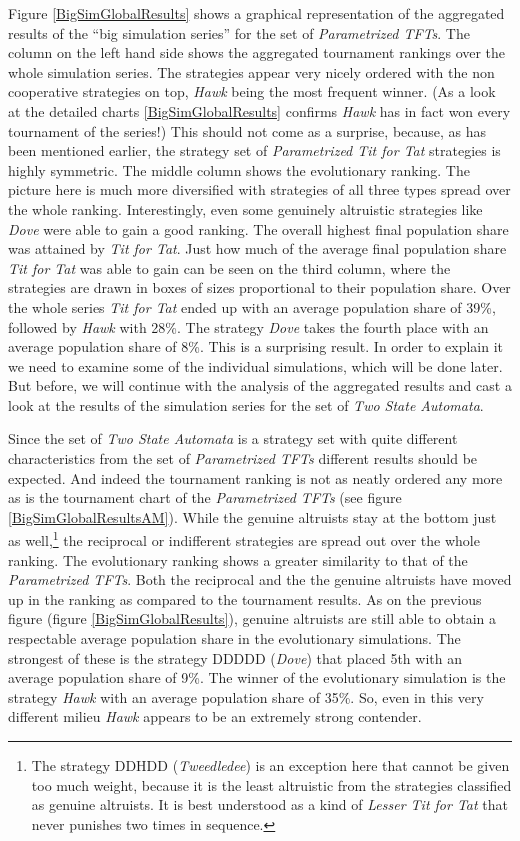 Figure \ref{BigSimGlobalResults} shows a graphical representation of the
aggregated results of the ``big simulation series'' for the set of {\em
  Parametrized TFTs}. The column on the left hand side shows the aggregated
tournament rankings over the whole simulation series. The strategies appear
very nicely ordered with the non cooperative strategies on top, {\em Hawk}
being the most frequent winner. (As a look at the detailed charts
\ref{BigSimGlobalResults} confirms {\em Hawk} has in fact won every tournament
of the series!) This should not come as a surprise, because, as has been
mentioned earlier, the strategy set of {\em Parametrized Tit for Tat}
strategies is highly symmetric. The middle column shows the evolutionary
ranking. The picture here is much more diversified with strategies of all
three types spread over the whole ranking. Interestingly, even some genuinely
altruistic strategies like {\em Dove} were able to gain a good ranking. The
overall highest final population share was attained by {\em Tit for Tat}. Just
how much of the average final population share {\em Tit for Tat} was able to
gain can be seen on the third column, where the strategies are drawn in boxes
of sizes proportional to their population share. Over the whole series {\em
  Tit for Tat} ended up with an average population share of 39\%, followed by
{\em Hawk} with 28\%. The strategy {\em Dove} takes the fourth place with an
average population share of 8\%. This is a surprising result. In order to
explain it we need to examine some of the individual simulations, which will
be done later. But before, we will continue with the analysis of the
aggregated results and cast a look at the results of the simulation series for
the set of {\em Two State Automata}.

Since the set of {\em Two State Automata} is a strategy set with quite
different characteristics from the set of {\em Parametrized TFTs} different
results should be expected. And indeed the tournament ranking is not as neatly
ordered any more as is the tournament chart of the {\em Parametrized TFTs}
(see figure \ref{BigSimGlobalResultsAM}). While the genuine altruists stay at
the bottom just as well,\footnote{The strategy DDHDD ({\em Tweedledee}) is an
  exception here that cannot be given too much weight, because it is the least
  altruistic from the strategies classified as genuine altruists. It is best
  understood as a kind of {\em Lesser Tit for Tat} that never punishes two
  times in sequence.} the reciprocal or indifferent strategies are spread out
over the whole ranking. The evolutionary ranking shows a greater similarity to
that of the {\em Parametrized TFTs}. Both the reciprocal and the the genuine
altruists have moved up in the ranking as compared to the tournament results.
As on the previous figure (figure \ref{BigSimGlobalResults}), genuine
altruists are still able to obtain a respectable average population share in
the evolutionary simulations. The strongest of these is the strategy DDDDD
({\em Dove}) that placed 5th with an average population share of 9\%. The
winner of the evolutionary simulation is the strategy {\em Hawk} with an
average population share of 35\%. So, even in this very different milieu {\em
  Hawk} appears to be an extremely strong contender.

